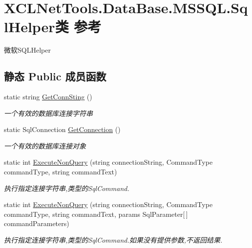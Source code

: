 \hypertarget{class_x_c_l_net_tools_1_1_data_base_1_1_m_s_s_q_l_1_1_sql_helper}{\section{X\-C\-L\-Net\-Tools.\-Data\-Base.\-M\-S\-S\-Q\-L.\-Sql\-Helper类 参考}
\label{class_x_c_l_net_tools_1_1_data_base_1_1_m_s_s_q_l_1_1_sql_helper}
}


微软\-S\-Q\-L\-Helper  


\subsection*{静态 Public 成员函数}
\begin{DoxyCompactItemize}
\item 
static string \hyperlink{class_x_c_l_net_tools_1_1_data_base_1_1_m_s_s_q_l_1_1_sql_helper_ae29b8af5f96ea8dd6c13c6955ffa7a6e}{Get\-Conn\-Sting} ()
\begin{DoxyCompactList}\small\item\em 一个有效的数据库连接字符串 \end{DoxyCompactList}\item 
static Sql\-Connection \hyperlink{class_x_c_l_net_tools_1_1_data_base_1_1_m_s_s_q_l_1_1_sql_helper_ad00003a2bc9f2d3feb548f522b5737f2}{Get\-Connection} ()
\begin{DoxyCompactList}\small\item\em 一个有效的数据库连接对象 \end{DoxyCompactList}\item 
static int \hyperlink{class_x_c_l_net_tools_1_1_data_base_1_1_m_s_s_q_l_1_1_sql_helper_a6f9f121a620f114867ec766f5416ade8}{Execute\-Non\-Query} (string connection\-String, Command\-Type command\-Type, string command\-Text)
\begin{DoxyCompactList}\small\item\em 执行指定连接字符串,类型的\-Sql\-Command. \end{DoxyCompactList}\item 
static int \hyperlink{class_x_c_l_net_tools_1_1_data_base_1_1_m_s_s_q_l_1_1_sql_helper_a8ba53c4b48eee0977a823b986d4f15a8}{Execute\-Non\-Query} (string connection\-String, Command\-Type command\-Type, string command\-Text, params Sql\-Parameter\mbox{[}$\,$\mbox{]} command\-Parameters)
\begin{DoxyCompactList}\small\item\em 执行指定连接字符串,类型的\-Sql\-Command.\-如果没有提供参数,不返回结果. \end{DoxyCompactList}\item 

\end{DoxyCompactItemize}
